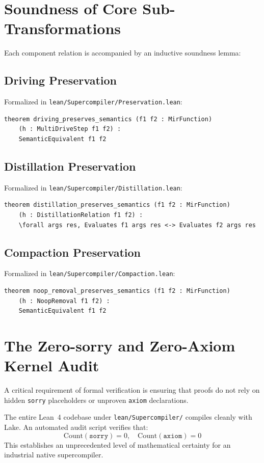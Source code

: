 \section{Soundness of Core Sub-Transformations}
\label{sec:preservation:lemmas}

Each component relation is accompanied by an inductive soundness lemma:

\subsection{Driving Preservation}
Formalized in \texttt{lean/Supercompiler/Preservation.lean}:
\begin{lstlisting}[language=Lean4]
theorem driving_preserves_semantics (f1 f2 : MirFunction)
    (h : MultiDriveStep f1 f2) :
    SemanticEquivalent f1 f2
\end{lstlisting}

\subsection{Distillation Preservation}
Formalized in \texttt{lean/Supercompiler/Distillation.lean}:
\begin{lstlisting}[language=Lean4]
theorem distillation_preserves_semantics (f1 f2 : MirFunction)
    (h : DistillationRelation f1 f2) :
    \forall args res, Evaluates f1 args res <-> Evaluates f2 args res
\end{lstlisting}

\subsection{Compaction Preservation}
Formalized in \texttt{lean/Supercompiler/Compaction.lean}:
\begin{lstlisting}[language=Lean4]
theorem noop_removal_preserves_semantics (f1 f2 : MirFunction)
    (h : NoopRemoval f1 f2) :
    SemanticEquivalent f1 f2
\end{lstlisting}

\section{The Zero-sorry and Zero-Axiom Kernel Audit}
\label{sec:preservation:audit}

A critical requirement of formal verification is ensuring that proofs do not rely on hidden \texttt{sorry} placeholders or unproven \texttt{axiom} declarations. 

The entire Lean~4 codebase under \texttt{lean/Supercompiler/} compiles cleanly with Lake. An automated audit script verifies that:
\begin{equation}
\text{Count}(\mathtt{sorry}) = 0, \quad \text{Count}(\mathtt{axiom}) = 0
\end{equation}
This establishes an unprecedented level of mathematical certainty for an industrial native supercompiler.

